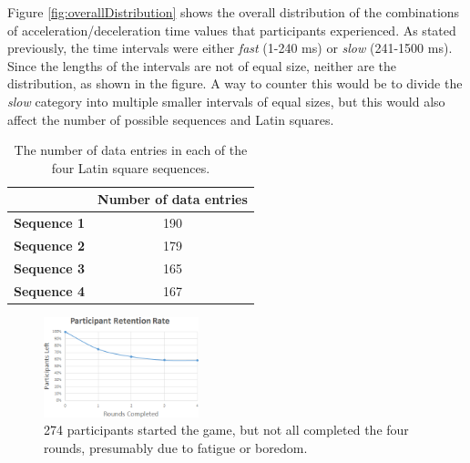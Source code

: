 Figure \ref{fig:overallDistribution} shows the overall distribution of the combinations of acceleration/deceleration time values that participants experienced. As stated previously, the time intervals were either \textit{fast} (1-240 ms) or \textit{slow} (241-1500 ms). Since the lengths of the intervals are not of equal size, neither are the distribution, as shown in the figure. A way to counter this would be to divide the \textit{slow} category into multiple smaller intervals of equal sizes, but this would also affect the number of possible sequences and Latin squares.\\

\begin{table} \centering
\caption{The number of data entries in each of the four Latin square sequences.}
\label{table:latinSequenceNumber}
\begin{tabular}{cc}
\toprule
& \textbf{Number of data entries}\\
\midrule
\textbf{Sequence 1} & 190\\
\textbf{Sequence 2} & 179\\
\textbf{Sequence 3} & 165\\
\textbf{Sequence 4} & 167\\
\bottomrule
\end{tabular}
\end{table}

\begin{figure}[htbp]
\centering
\includegraphics[width=0.4\textwidth]{Pics/retetionRate}
\caption{274 participants started the game, but not all completed the four rounds, presumably due to fatigue or boredom.}
\label{fig:retention}
\end{figure}

